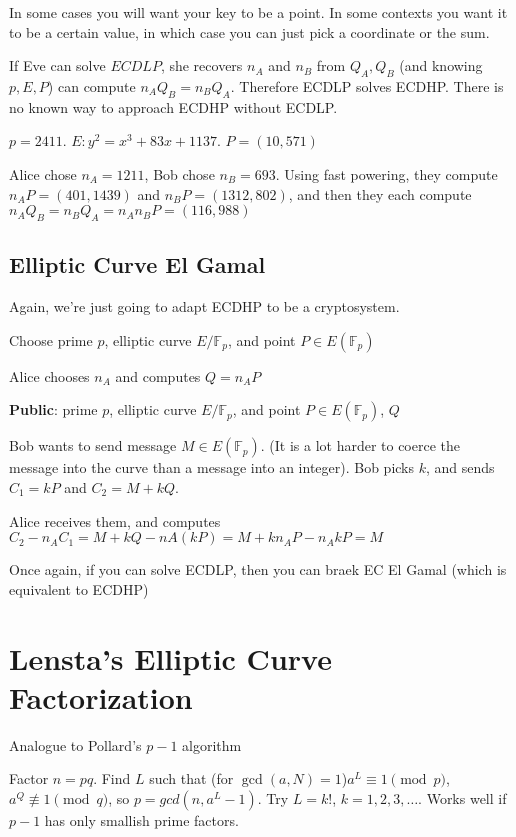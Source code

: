 \documentclass[twoside, 10pt]{article}
\newcommand{\F}{\mathbb{F}}
\begin{document}
\begin{rmk}
    In some cases you will want your key to be a point. In some contexts you want it to be a certain value, in which case you can just pick a coordinate or the sum.
\end{rmk}

If Eve can solve $ECDLP$, she recovers $n_A$ and $n_B$ from $Q_A, Q_B$ (and knowing $p, E, P$) can compute $n_AQ_B = n_BQ_A$. Therefore ECDLP solves ECDHP. There is no known way to approach ECDHP without ECDLP.

\begin{exm*}
    $p = 2411$. $E: y^2 = x^3 + 83x + 1137$. $P = (10, 571)$
\end{exm*}

Alice chose $n_A = 1211$, Bob chose $n_B = 693$. Using fast powering, they compute $n_AP = (401, 1439)$ and $n_BP = (1312, 802)$, and then they each compute $n_AQ_B =  n_BQ_A = n_An_BP = (116, 988)$

\subsection{Elliptic Curve El Gamal} Again, we're just going to adapt ECDHP to be a cryptosystem.

Choose prime $p$, elliptic curve $E/\F_p$, and point $P \in E(\F_p)$

Alice chooses $n_A$ and computes $Q = n_A P$

\textbf{Public}: prime $p$, elliptic curve $E/\F_p$, and point $P \in E(\F_p)$, $Q$

Bob wants to send message $M \in E(\F_p)$. (It is a lot harder to coerce the message into the curve than a message into an integer). Bob picks $k$, and sends $C_1 = kP$ and $C_2 = M + kQ$.

Alice receives them, and computes $C_2 - n_AC_1 = M + kQ- nA(kP) = M + kn_AP - n_AkP = M$

Once again, if you can solve ECDLP, then you can braek EC El Gamal (which is equivalent to ECDHP)

\section{Lensta's Elliptic Curve Factorization}
Analogue to Pollard's $p-1$ algorithm

Factor $n = pq$. Find $L$ such that (for $\gcd(a, N) = 1$)$a^L \equiv 1 \pmod{p}$, $a^Q \not\equiv 1\pmod{q}$, so $p = gcd(n, a^L - 1)$.
Try $L = k!$, $k = 1, 2, 3, \ldots$. Works well if $p-1$ has only smallish prime factors.
\end{document}
